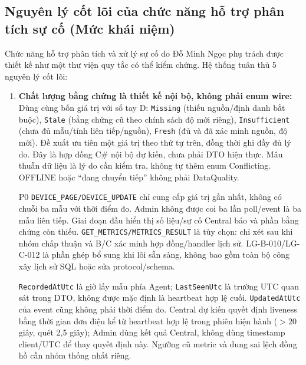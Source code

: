 \documentclass[12pt,a4paper]{article}
\begin{document}
\subsection{Nguyên lý cốt lõi của chức năng hỗ trợ phân tích sự cố (Mức khái niệm)}

Chức năng hỗ trợ phân tích và xử lý sự cố do Đỗ Minh Ngọc phụ trách được thiết kế như một thư viện quy tắc có thể kiểm chứng. Hệ thống tuân thủ 5 nguyên lý cốt lõi:

\begin{enumerate}
  \item \textbf{Chất lượng bằng chứng là thiết kế nội bộ, không phải enum wire:}
  Dùng cùng bốn giá trị với sổ tay D: \texttt{Missing} (thiếu nguồn/định danh bắt buộc), \texttt{Stale} (bằng chứng cũ theo chính sách độ mới riêng), \texttt{Insufficient} (chưa đủ mẫu/tính liên tiếp/nguồn), \texttt{Fresh} (đủ và đã xác minh nguồn, độ mới). Đề xuất ưu tiên một giá trị theo thứ tự trên, đồng thời ghi đầy đủ lý do. Đây là hợp đồng C\# nội bộ dự kiến, chưa phải DTO hiện thực. Mâu thuẫn dữ liệu là lý do cần kiểm tra, không tự thêm enum Conflicting. OFFLINE hoặc ``đang chuyển tiếp'' không phải DataQuality.

  P0 \texttt{DEVICE\_PAGE/DEVICE\_UPDATE} chỉ cung cấp giá trị gần nhất, không có chuỗi ba mẫu với thời điểm đo. Admin không được coi ba lần poll/event là ba mẫu liên tiếp. Giai đoạn đầu hiển thị số liệu/sự cố Central báo và phần bằng chứng còn thiếu. \texttt{GET\_METRICS/METRICS\_RESULT} là tùy chọn: chỉ xét sau khi nhóm chấp thuận và B/C xác minh hợp đồng/handler lịch sử. LG-B-010/LG-C-012 là phần ghép bổ sung khi lõi sẵn sàng, không bao gồm toàn bộ công xây lịch sử SQL hoặc sửa protocol/schema.

  \texttt{RecordedAtUtc} là giờ lấy mẫu phía Agent; \texttt{LastSeenUtc} là trường UTC quan sát trong DTO, không được mặc định là heartbeat hợp lệ cuối. \texttt{UpdatedAtUtc} của event cũng không phải thời điểm đo. Central dự kiến quyết định liveness bằng thời gian đơn điệu kể từ heartbeat hợp lệ trong phiên hiện hành ($>20$ giây, quét 2,5 giây); Admin dùng kết quả Central, không dùng timestamp client/UTC để thay quyết định này. Ngưỡng cũ metric và dung sai lệch đồng hồ cần nhóm thống nhất riêng.


\end{enumerate}
\end{document}
